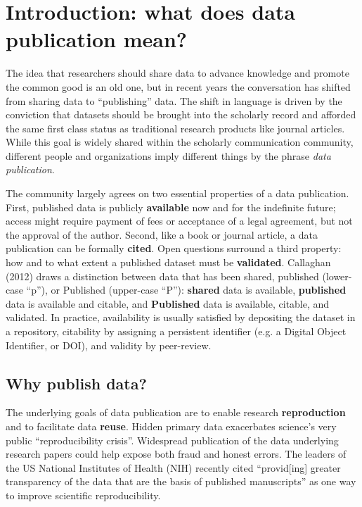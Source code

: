 \documentclass[10pt,twocolumn]{article}
\begin{document}
\section*{Introduction: what does data publication mean?}\label{introduction}

The idea that researchers should share data to advance knowledge and promote the common good is an old one, but in recent years the conversation has shifted from sharing data to ``publishing'' data.\cite{costello_motivating_2009,smith_data_2009,lawrence_data_2011}
The shift in language is driven by the conviction that datasets should be brought into the scholarly record and afforded the same first class status as traditional research products like journal articles.\cite{sarah_callaghan_making_2012}
While this goal is widely shared within the scholarly communication community, different people and organizations imply different things by the phrase \emph{data publication}. %

The community largely agrees on two essential properties of a data publication\cite{smith_data_2009,sarah_callaghan_making_2012}.
First, published data is publicly \textbf{available} now and for the indefinite future; access might require payment of fees or acceptance of a legal agreement, but not the approval of the author.
Second, like a book or journal article, a data publication can be formally \textbf{cited}.
Open questions surround a third property: how and to what extent a published dataset must be \textbf{validated}.
Callaghan (2012)\cite{sarah_callaghan_making_2012} draws a distinction between data that has been shared, published (lower-case “p”), or Published (upper-case “P”): \textbf{shared} data is available, \textbf{published} data is available and citable, and \textbf{Published} data is available, citable, and validated.
In practice, availability is usually satisfied by depositing the dataset in a repository, citability by assigning a persistent identifier (e.g. a Digital Object Identifier, or DOI), and validity by peer-review.

\subsection*{Why publish data?}\label{why-publish-data}

The underlying goals of data publication are to enable research \textbf{reproduction} and to facilitate data \textbf{reuse}.
Hidden primary data exacerbates science's very public ``reproducibility crisis''\cite{mobley_survey_2013,pashler_is_2012,zimmer_rise_2012,hiltzik_science_2013,begley_drug_2012}.
Widespread publication of the data underlying research papers could help expose both fraud and honest errors\cite{drew_lost_2013}.
The leaders of the US National Institutes of Health (NIH) recently cited ``provid[ing] greater transparency of the data that are the basis of published manuscripts'' as one way to improve scientific reproducibility\cite{collins_nih_2014}.
\end{document}
